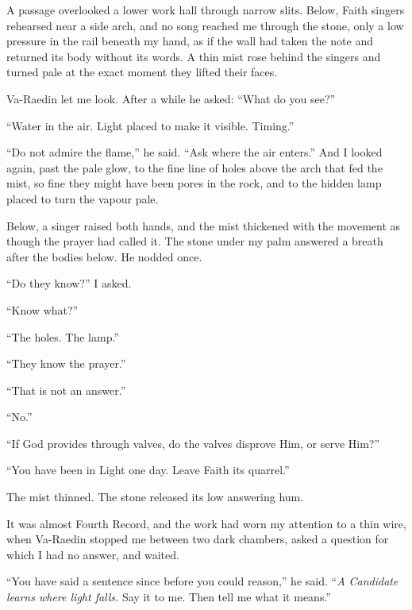 A passage overlooked a lower work hall through narrow slits. Below, Faith singers rehearsed near a side arch, and no song reached me through the stone, only a low pressure in the rail beneath my hand, as if the wall had taken the note and returned its body without its words. A thin mist rose behind the singers and turned pale at the exact moment they lifted their faces.\par

Va-Raedin let me look. After a while he asked: ``What do you see?''\par
``Water in the air. Light placed to make it visible. Timing.'' \par
``Do not admire the flame,'' he said. ``Ask where the air enters.'' And I looked again, past the pale glow, to the fine line of holes above the arch that fed the mist, so fine they might have been pores in the rock, and to the hidden lamp placed to turn the vapour pale.\par

Below, a singer raised both hands, and the mist thickened with the movement as though the prayer had called it. The stone under my palm answered a breath after the bodies below. He nodded once.\par

``Do they know?'' I asked.\par
``Know what?''\par
``The holes. The lamp.''\par
``They know the prayer.''\par
``That is not an answer.''\par
``No.''\par
``If God provides through valves, do the valves disprove Him, or serve Him?''\par
``You have been in Light one day. Leave Faith its quarrel.''\par

The mist thinned. The stone released its low answering hum.\par

It was almost Fourth Record, and the work had worn my attention to a thin wire, when Va-Raedin stopped me between two dark chambers, asked a question for which I had no answer, and waited.\par

``You have said a sentence since before you could reason,'' he said. ``\textit{A Candidate learns where light falls.} Say it to me. Then tell me what it means.''\par

